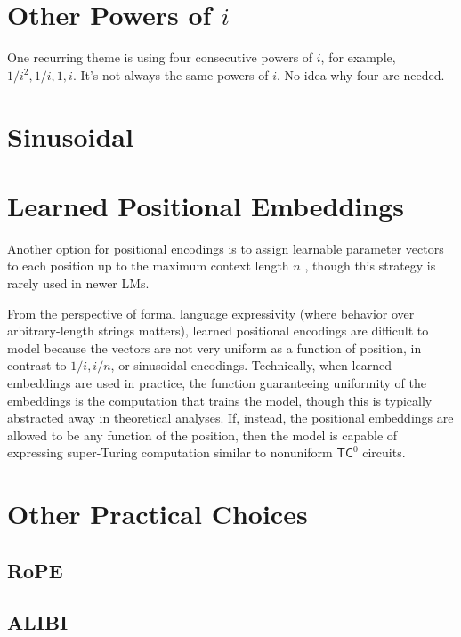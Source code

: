 \section{Other Powers of $i$}

One recurring theme is using four consecutive powers of $i$, for example, $1/i^2, 1/i, 1, i$. It's not always the same powers of $i$. No idea why four are needed.

\section{Sinusoidal}


\section{Learned Positional Embeddings}

Another option for positional encodings is to assign learnable parameter vectors to each position up to the maximum context length $n$ \citep{vaswani-etal-2017-attention}, though this strategy is rarely used in newer LMs.

From the perspective of formal language expressivity (where behavior over arbitrary-length strings matters), learned positional encodings are difficult to model because the vectors are not very uniform as a function of position, in contrast to $1/i, i/n$, or sinusoidal encodings.
Technically, when learned embeddings are used in practice, the function guaranteeing uniformity of the embeddings is the computation that trains the model, though this is typically abstracted away in theoretical analyses.
If, instead, the positional embeddings are allowed to be any function of the position, then the model is capable of expressing super-Turing computation similar to nonuniform $\mathsf{TC}^0$ circuits.

\section{Other Practical Choices}

\subsection{RoPE}

\subsection{ALIBI}